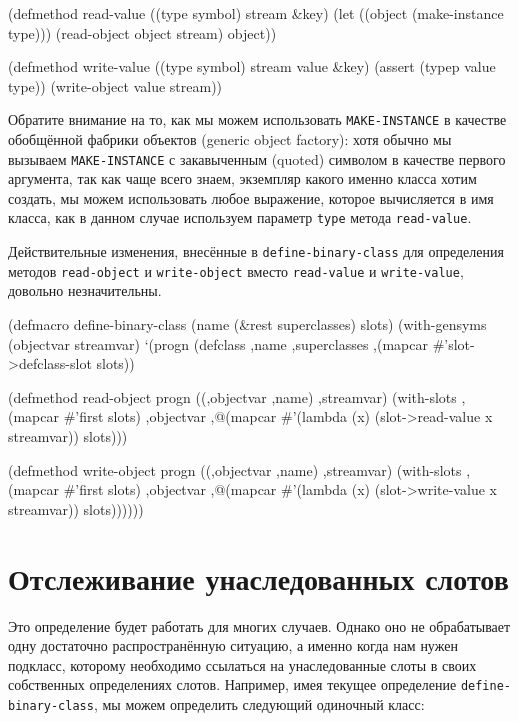 \begin{myverb}
(defmethod read-value ((type symbol) stream &key)
  (let ((object (make-instance type)))
    (read-object object stream)
    object))

(defmethod write-value ((type symbol) stream value &key)
  (assert (typep value type))
  (write-object value stream))
\end{myverb}

Обратите внимание на то, как мы можем использовать \lstinline{MAKE-INSTANCE} в ка\-чест\-ве
обобщённой фабрики объектов (generic object factory): хотя обычно мы вызываем
\lstinline{MAKE-INSTANCE} с закавыченным (quoted) символом в качестве первого аргумента, так
как чаще всего знаем, экземпляр какого именно класса хотим создать, мы можем использовать
любое выражение, которое вычисляется в имя класса, как в данном случае используем параметр
\lstinline{type} метода \lstinline{read-value}.

Действительные изменения, внесённые в \lstinline{define-binary-class} для определения методов
\lstinline{read-object} и \lstinline{write-object} вместо \lstinline{read-value} и \lstinline{write-value},
довольно незначительны.

\begin{myverb}
(defmacro define-binary-class (name (&rest superclasses) slots)
  (with-gensyms (objectvar streamvar)
    `(progn
       (defclass ,name ,superclasses
         ,(mapcar #'slot->defclass-slot slots))

       (defmethod read-object progn ((,objectvar ,name) ,streamvar)
         (with-slots ,(mapcar #'first slots) ,objectvar
           ,@(mapcar #'(lambda (x) (slot->read-value x streamvar)) slots)))

       (defmethod write-object progn ((,objectvar ,name) ,streamvar)
         (with-slots ,(mapcar #'first slots) ,objectvar
           ,@(mapcar #'(lambda (x) (slot->write-value x streamvar)) slots))))))
\end{myverb}

\section{Отслеживание унаследованных слотов}

Это определение будет работать для многих случаев. Однако оно не обрабатывает одну
достаточно распространённую ситуацию, а именно когда нам нужен подкласс, которому
необходимо ссылаться на унаследованные слоты в своих собственных определениях
слотов. Например, имея текущее определение \lstinline{define-binary-class}, мы можем определить
следующий одиночный класс:

